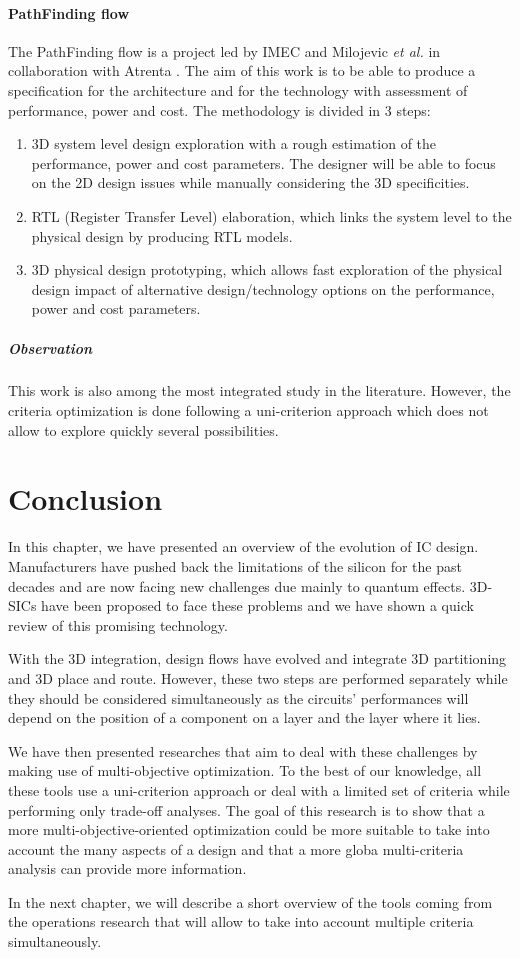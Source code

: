 \paragraph{PathFinding flow}
The PathFinding flow is a project led by IMEC and Milojevic \textit{et al.} in collaboration with Atrenta \cite{5335663,DBLP:conf/3dic/MilojevicCCRRSAPM09}. The aim of this work is to be able to produce a specification for the architecture and for the technology with assessment of performance, power and cost. The methodology is divided in 3 steps:
\begin{enumerate}
\item 3D system level design exploration with a rough estimation of the performance, power and cost parameters. The designer will be able to focus on the 2D design issues while manually considering the 3D specificities.
\item RTL (Register Transfer Level) elaboration, which links the system level to the physical design by producing RTL models.
\item 3D physical design prototyping, which allows fast exploration of the physical design impact of alternative design/technology options on the performance, power and cost parameters.
\end{enumerate}

\subparagraph{Observation}
This work is also among the most integrated study in the literature. However, the criteria optimization is done following a uni-criterion approach which does not allow to explore quickly several possibilities.

\section{Conclusion}
In this chapter, we have presented an overview of the evolution of IC design. Manufacturers have pushed back the limitations of the silicon for the past decades and are now facing new challenges due mainly to quantum effects. 3D-SICs have been proposed to face these problems and we have shown a quick review of this promising technology.

With the 3D integration, design flows have evolved and integrate 3D partitioning and 3D place and route. However, these two steps are performed separately while they should be considered simultaneously as the circuits' performances will depend on the position of a component on a layer and the layer where it lies.

We have then presented researches that aim to deal with these challenges by making use of multi-objective optimization. To the best of our knowledge, all these tools use a uni-criterion approach or deal with a limited set of criteria while performing only trade-off analyses. The goal of this research is to show that a more multi-objective-oriented optimization could be more suitable to take into account the many aspects of a design and that a more globa multi-criteria analysis can provide more information.

In the next chapter, we will describe a short overview of the tools coming from the operations research that will allow to take into account multiple criteria simultaneously.